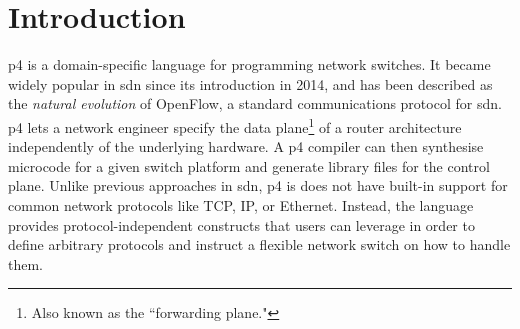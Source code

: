 \chapter*{Introduction}
\setcounter{page}{1}

\newcommand{\pfs}{\texorpdfstring{{P}4\textsubscript{16}}{P4 16} }

\begin{chapterabstract}
\end{chapterabstract}

\acrfull{p4} is a domain-specific language for programming network switches. It
became widely popular in \acrfull{sdn} since its introduction in
2014\cite{p4original}, and has been described as the \emph{natural evolution}
of OpenFlow, a standard communications protocol for \acrshort{sdn}.
\acrshort{p4} lets a network engineer specify the data plane\footnote{Also known
as the ``forwarding plane."} of a router architecture independently of the
underlying hardware. A \acrshort{p4} compiler can then synthesise microcode for
a given switch platform and generate library files for the control plane. Unlike
previous approaches in \acrshort{sdn}, \acrshort{p4} is does not have built-in
support for common network protocols like TCP, IP, or Ethernet. Instead, the
language provides protocol-independent constructs that users can leverage in
order to define arbitrary protocols and instruct a flexible network switch on
how to handle them.


